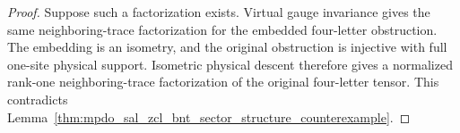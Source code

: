 \begin{proof}\leanok
    Suppose such a factorization exists. Virtual gauge invariance gives the
    same neighboring-trace factorization for the embedded four-letter
    obstruction. The embedding is an isometry, and the original obstruction
    is injective with full one-site physical support. Isometric physical
    descent therefore gives a normalized rank-one neighboring-trace
    factorization of the original four-letter tensor. This contradicts
    Lemma~\ref{thm:mpdo_sal_zcl_bnt_sector_structure_counterexample}.
\end{proof}

